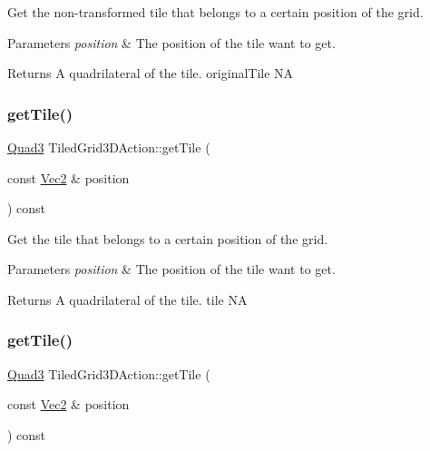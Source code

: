 Get the non-\/transformed tile that belongs to a certain position of the grid. 


\begin{DoxyParams}{Parameters}
{\em position} & The position of the tile want to get. \\
\hline
\end{DoxyParams}
\begin{DoxyReturn}{Returns}
A quadrilateral of the tile.  original\+Tile  NA 
\end{DoxyReturn}
\mbox{\label{classTiledGrid3DAction_a302f322743e028d4b4002af22490e117}} 
\subsubsection{\texorpdfstring{get\+Tile()}{getTile()}\hspace{0.1cm}{\footnotesize\ttfamily [1/2]}}
{\footnotesize\ttfamily \hyperlink{structQuad3}{Quad3} Tiled\+Grid3\+D\+Action\+::get\+Tile (\begin{DoxyParamCaption}\item[{const \hyperlink{classVec2}{Vec2} \&}]{position }\end{DoxyParamCaption}) const}



Get the tile that belongs to a certain position of the grid. 


\begin{DoxyParams}{Parameters}
{\em position} & The position of the tile want to get. \\
\hline
\end{DoxyParams}
\begin{DoxyReturn}{Returns}
A quadrilateral of the tile.  tile  NA 
\end{DoxyReturn}
\mbox{\label{classTiledGrid3DAction_a302f322743e028d4b4002af22490e117}} 
\subsubsection{\texorpdfstring{get\+Tile()}{getTile()}\hspace{0.1cm}{\footnotesize\ttfamily [2/2]}}
{\footnotesize\ttfamily \hyperlink{structQuad3}{Quad3} Tiled\+Grid3\+D\+Action\+::get\+Tile (\begin{DoxyParamCaption}\item[{const \hyperlink{classVec2}{Vec2} \&}]{position }\end{DoxyParamCaption}) const}



